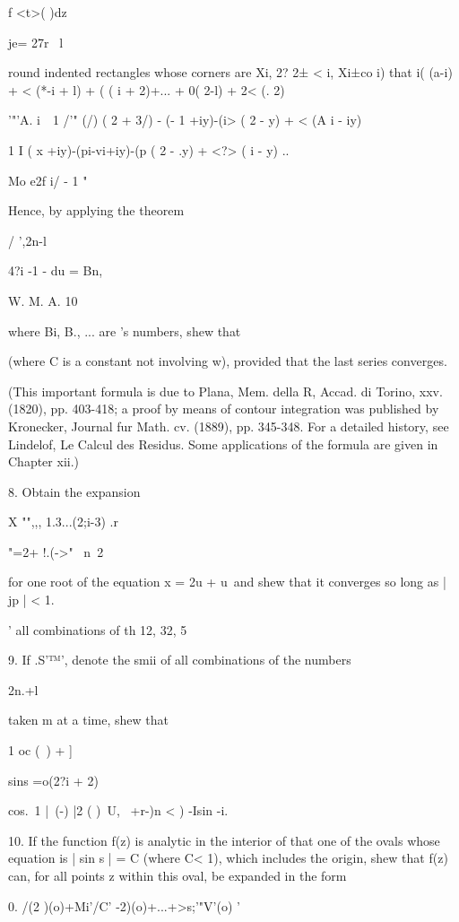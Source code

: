 {f <t>( )dz

je= 27r \ l

round indented rectangles whose corners are Xi, 2? 2± < i, Xi±co i)
that i( (a-i) + < (*-i + l) + ( ( i + 2)+... + 0( 2-l) + 2< (. 2)

'"'A. i~\, 1 /'" (/) ( 2 + 3/) - (- 1 +iy)-(i> ( 2 - y) + < (A i -
iy)

1 I ( x +iy)-(pi-vi+iy)-(p ( 2 - .y) + <?> ( i - y) ..

Mo e2f i/ - 1  "

Hence, by applying the theorem

/ ',2n-l

4?i -1 - du = Bn,

W. M. A. 10

%
%

where Bi, B., ... are \Bernoulli's numbers, shew that

(where C is a constant not involving w), provided that the last series
converges.

(This important formula is due to Plana, Mem. della R, Accad. di
Torino, xxv. (1820), pp. 403-418; a proof by means of contour
integration was published by Kronecker, Journal fur Math. cv. (1889),
pp. 345-348. For a detailed history, see Lindelof, Le Calcul des
Residus. Some applications of the formula are given in Chapter xii.)

8. Obtain the expansion

X "",,, 1.3...(2;i-3) .r

"=2+ !.(->"~ n\ 2

for one root of the equation x = 2u + u\ and shew that it converges so
long as | jp | < 1.

' all combinations of th 12, 32, 5%

9. If .S'™', denote the smii of all combinations of the numbers

2n.+l

taken m at a time, shew that

1 oc (\ ) + ]

sins =o(2?i + 2)

cos.\ 1 |\ (-) |2 ( )\ U, \ +r-)n < ) -Isin -i.


10. If the function f(z) is analytic in the interior of that one of
the ovals whose equation is | sin s | = C (where C< 1), which includes
the origin, shew that f(z) can, for all points z within this oval, be
expanded in the form

0. /(2 )(o)+Mi'/C' -2)(o)+...+>s;'"V'(o) '

}

